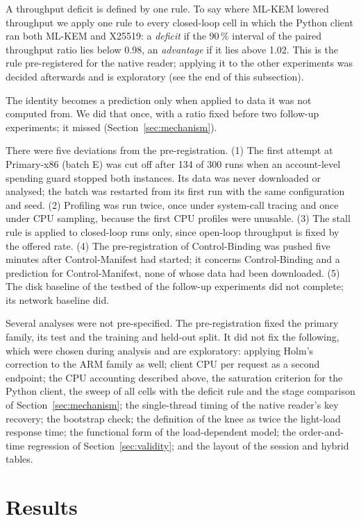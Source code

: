 \documentclass[conference]{IEEEtran}
\newcommand{\lab}[1]{\textsf{#1}}
\begin{document}
A throughput deficit is defined by one rule. To say where ML-KEM lowered throughput we apply
one rule to every closed-loop cell in which the Python client ran both ML-KEM and X25519: a
\emph{deficit} if the 90\,\% interval of the paired throughput ratio lies below 0.98, an
\emph{advantage} if it lies above 1.02. This is the rule pre-registered for the native reader;
applying it to the other experiments was decided afterwards and is exploratory
(see the end of this subsection).

The identity becomes a prediction only when applied to data it
was not computed from. We did that once, with a ratio fixed before two follow-up experiments;
it missed (Section~\ref{sec:mechanism}).

There were five deviations from the pre-registration.
(1) The first attempt at \lab{Primary-x86} (batch E) was cut off after 134 of 300 runs when an account-level spending
guard stopped both instances. Its data was never downloaded or analysed; the batch was restarted
from its first run with the same configuration and seed. (2) \lab{Profiling} was run twice,
once under system-call tracing and once under CPU sampling, because the first CPU profiles were
unusable. (3) The stall rule is applied to closed-loop runs only, since open-loop throughput is
fixed by the offered rate. (4) The pre-registration of \lab{Control-Binding} was pushed five minutes after
\lab{Control-Manifest} had started; it concerns \lab{Control-Binding} and a prediction for
\lab{Control-Manifest}, none of whose data had been downloaded. (5) The disk baseline of the
testbed of the follow-up experiments did not complete; its network baseline did.

Several analyses were not pre-specified. The pre-registration fixed the primary family, its test and the
training and held-out split. It did not fix the following, which were chosen during analysis and
are exploratory: applying Holm's correction to the ARM family as well; client CPU per request as a
second endpoint; the CPU accounting described above, the saturation criterion for
the Python client, the sweep of all cells with the deficit rule and the stage comparison of
Section~\ref{sec:mechanism};
the single-thread timing of the native reader's key recovery;
the bootstrap check; the definition of the knee as twice the light-load response time; the
functional form of the load-dependent model; the order-and-time regression of
Section~\ref{sec:validity}; and the layout of the session and hybrid tables.

\section{Results}\label{sec:results}
\end{document}
